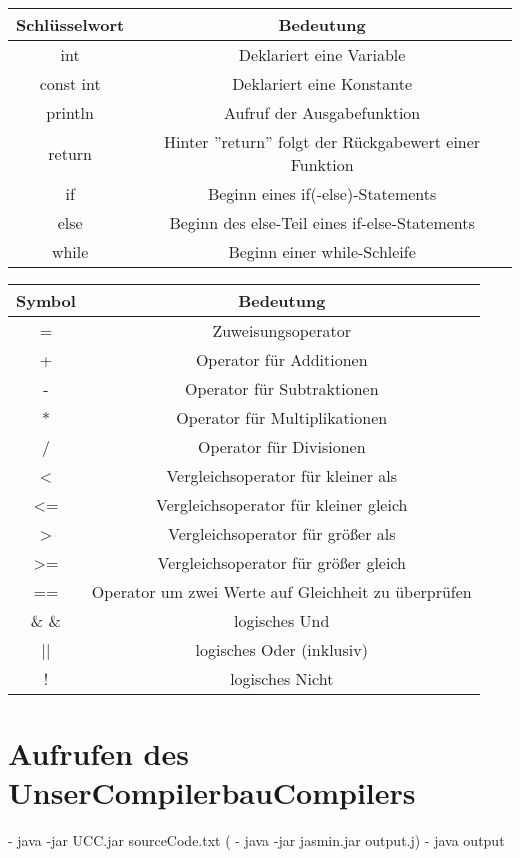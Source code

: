 \begin{center}
  \begin{tabular}{ | c | c | }
    \hline
    Schlüsselwort & Bedeutung\\ \hline \hline
    int & Deklariert eine Variable\\ \hline
    const int & Deklariert eine Konstante\\ \hline
    println & Aufruf der Ausgabefunktion\\ \hline
    return & Hinter ''return'' folgt der Rückgabewert einer Funktion\\ \hline
    if & Beginn eines if(-else)-Statements\\ \hline
    else & Beginn des else-Teil eines if-else-Statements\\ \hline
    while & Beginn einer while-Schleife\\ \hline
    
  \end{tabular}
\end{center}


\begin{center}
  \begin{tabular}{ | c | c | }
    \hline
    Symbol & Bedeutung\\ \hline \hline
    = & Zuweisungsoperator\\ \hline
    + & Operator für Additionen\\ \hline
    - & Operator für Subtraktionen\\ \hline
    * & Operator für Multiplikationen\\ \hline
    / & Operator für Divisionen\\ \hline
    
    < & Vergleichsoperator für kleiner als\\ \hline
    <= & Vergleichsoperator für kleiner gleich\\ \hline
    > & Vergleichsoperator für größer als\\ \hline
    >= & Vergleichsoperator für größer gleich\\ \hline    
    == & Operator um zwei Werte auf Gleichheit zu überprüfen\\ \hline    
    
    \& \&  & logisches Und \\ \hline    
    || & logisches Oder (inklusiv) \\ \hline    
    ! & logisches Nicht \\ \hline    
    
  \end{tabular}
\end{center}
	
\section{Aufrufen des UnserCompilerbauCompilers}
	- java -jar UCC.jar sourceCode.txt
  (	- java -jar jasmin.jar output.j)
- java output